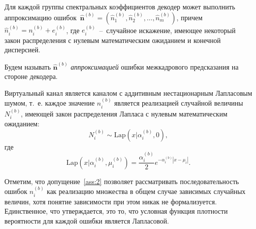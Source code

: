 \begin{assumption}
  Для каждой группы спектральных коэффициентов декодер может выполнить аппроксимацию ошибок~$\hat{\mathbf{n}}^{(b)} = ( \hat{n}^{(b)}_{1}, \hat{n}^{(b)}_{2},\ldots,\hat{n}^{(b)}_{m})$, причем $\hat{n}^{(b)}_{i} = n^{(b)}_{i} + e^{(b)}_{i}$, где $e^{(b)}_{i}$~--~случайное искажение, имеющее некоторый закон распределения с нулевым математическим ожиданием и конечной дисперсией.
  \label{ass:1}
\end{assumption}
Будем называть $\hat{\mathbf{n}}^{(b)}$ \emph{аппроксимацией} ошибки межкадрового предсказания на стороне декодера.
\begin{assumption}
    Виртуальный канал является каналом с аддитивным нестационарным Лапласовым шумом, т.~е. каждое значение $n^{(b)}_{i}$ является реализацией случайной величины $N^{(b)}_{i}$, имеющей закон распределения Лапласа с нулевым математическим ожиданием:    
    \begin{equation*}
        N^{(b)}_{i} \sim \mathrm{Lap}(x \vert \alpha^{(b)}_{i} ,0),
    \end{equation*}
    где
    \begin{equation*}
        \mathrm{Lap}(x \vert \alpha^{(b)}_i ,\mu^{(b)}_i) = \frac{\alpha^{(b)}_i}{2} e^{-\alpha^{(b)}_i |x-\mu_i|}.
    \end{equation*}
  \label{ass:2}
\end{assumption}

Отметим, что допущение~\ref{ass:2} позволяет рассматривать последовательность ошибок $n^{(b)}_{i}$ как реализацию множества в общем случае зависимых случайных величин, хотя понятие зависимости при этом никак не формализуется. Единственное, что утверждается, это то, что условная функция плотности вероятности для каждой ошибки является Лапласовой.

